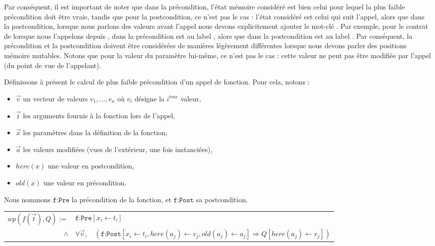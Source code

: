 Par conséquent, il est important de noter que dans la précondition, l'état mémoire
considéré est bien celui pour lequel la plus faible précondition doit être vraie,
tandis que pour la postcondition, ce n'est pas le cas : l'état considéré est celui
qui suit l'appel, alors que dans la postcondition, lorsque nous parlons des valeurs
avant l'appel nous devons explicitement ajouter le mot-clé
. Par exemple, pour le contrat de 
lorsque nous l'appelons depuis ,  dans la
précondition est  au label , alors que 
dans la postcondition est  au label . Par conséquent,
la précondition et la postcondition doivent être considérées de manières légèrement
différentes lorsque nous devons parler des positions mémoire mutables. Notons que
pour la valeur du paramètre  lui-même, ce n'est pas le cas : cette
valeur ne peut pas être modifiée par l'appel (du point de vue de l'appelant).



Définissons à présent le calcul de plus faible précondition d'un appel de fonction.
Pour cela, notons :

\begin{itemize}
\item $\vec{v}$ un vecteur de valeurs $v_1, ..., v_n$ où $v_i$ désigne la $i^{ème}$ valeur,
\item $\vec{t}$ les arguments fournis à la fonction lors de l'appel,
\item $\vec{x}$ les paramètres dans la définition de la fonction,
\item $\vec{a}$ les valeurs modifiées (vues de l'extérieur, une fois instanciées),
\item $here(x)$ une valeur en postcondition,
\item $old(x)$ une valeur en précondition.
\end{itemize}

Nous nommons $\texttt{f:Pre}$ la précondition de la fonction, et $\texttt{f:Post}$
sa postcondition.

\begin{center}
\begin{tabular}{rl}
  $wp( f(\vec{t}), Q ) :=$ & $\texttt{f:Pre}[x_i \leftarrow t_i]$ \\
  $\wedge$ & $\forall \vec{v}, \quad (
              \texttt{f:Post}[x_i \leftarrow t_i,
                              here(a_j) \leftarrow v_j,
                              old(a_j) \leftarrow a_j] \Rightarrow
              Q[here(a_j) \leftarrow v_j])$
\end{tabular}
\end{center}

